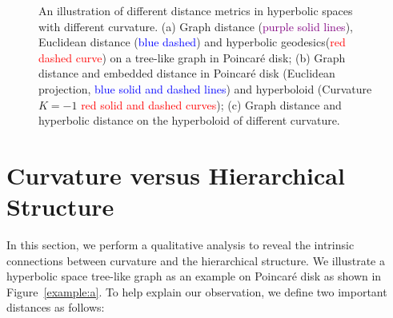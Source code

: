 \begin{figure}[t]
\centering
{}%
%
\centering
\caption{An illustration of different distance metrics in hyperbolic spaces with different curvature. 
(a) Graph distance (\textcolor{purple}{purple solid lines}), Euclidean distance (\textcolor{blue}{blue dashed}) and hyperbolic geodesics(\textcolor{red}{red dashed curve}) on a tree-like graph in Poincaré disk; 
(b) Graph distance and embedded distance in Poincaré disk (Euclidean projection, \textcolor{blue}{blue solid and dashed lines}) and hyperboloid (Curvature $K = -1$ \textcolor{red}{red solid and dashed curves}); 
(c) Graph distance and hyperbolic distance on the hyperboloid of different curvature. }
\label{example}
\end{figure}

\section{Curvature versus Hierarchical Structure}
\label{section 3}
In this section, we perform a qualitative analysis to reveal the intrinsic connections between curvature and the hierarchical structure. 
We illustrate a hyperbolic space tree-like graph as an example on Poincaré disk as shown in Figure~\ref{example:a}. 
To help explain our observation, we define two important distances as follows: 

